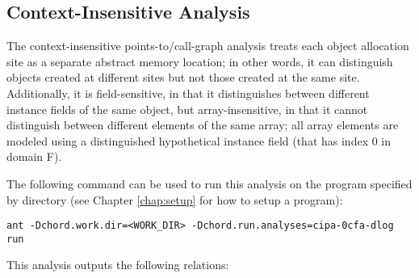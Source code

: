 \subsection{Context-Insensitive Analysis}

The context-insensitive points-to/call-graph analysis treats each object
allocation site as a separate abstract memory location; in other words, it can
distinguish objects created at different sites but not those created at the same
site.  Additionally, it is field-sensitive, in that it distinguishes between
different instance fields of the same object, but array-insensitive, in that it
cannot distinguish between different elements of the same array; all array
elements are modeled using a distinguished hypothetical instance field (that has
index 0 in domain F).

The following command can be used to run this analysis on the program specified
by directory  (see Chapter \ref{chap:setup} for how to setup a
program):

\begin{framed}
\begin{verbatim}
ant -Dchord.work.dir=<WORK_DIR> -Dchord.run.analyses=cipa-0cfa-dlog run
\end{verbatim}
\end{framed}

This analysis outputs the following relations:

